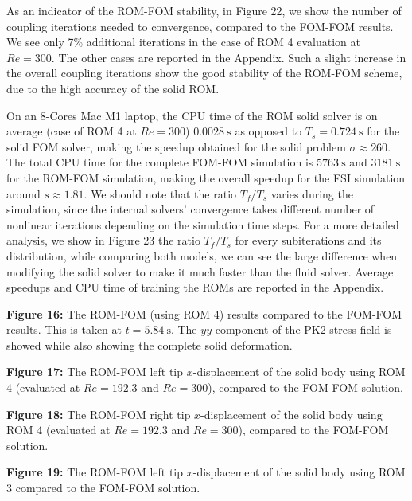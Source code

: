 \documentclass[11pt]{article}
\begin{document}
As an indicator of the ROM-FOM stability, in Figure 22, we show the number of coupling iterations needed to convergence, compared to the FOM-FOM results. We see only 7\% additional iterations in the case of ROM 4 evaluation at $Re = 300$. The other cases are reported in the Appendix. Such a slight increase in the overall coupling iterations show the good stability of the ROM-FOM scheme, due to the high accuracy of the solid ROM.

On an 8-Cores Mac M1 laptop, the CPU time of the ROM solid solver is on average (case of ROM 4 at $Re = 300$) $0.0028\ \mathrm{s}$ as opposed to $T_s = 0.724\ \mathrm{s}$ for the solid FOM solver, making the speedup obtained for the solid problem $\sigma \approx 260$. The total CPU time for the complete FOM-FOM simulation is $5763\ \mathrm{s}$ and $3181\ \mathrm{s}$ for the ROM-FOM simulation, making the overall speedup for the FSI simulation around $s \approx 1.81$. We should note that the ratio $T_f/T_s$ varies during the simulation, since the internal solvers' convergence takes different number of nonlinear iterations depending on the simulation time steps. For a more detailed analysis, we show in Figure 23 the ratio $T_f/T_s$ for every subiterations and its distribution, while comparing both models, we can see the large difference when modifying the solid solver to make it much faster than the fluid solver. Average speedups and CPU time of training the ROMs are reported in the Appendix.

\begin{center}
\textbf{Figure 16:} The ROM-FOM (using ROM 4) results compared to the FOM-FOM results. This is taken at $t = 5.84\ \mathrm{s}$. The $yy$ component of the PK2 stress field is showed while also showing the complete solid deformation.
\end{center}

\begin{center}
\textbf{Figure 17:} The ROM-FOM left tip $x$-displacement of the solid body using ROM 4 (evaluated at $Re = 192.3$ and $Re = 300$), compared to the FOM-FOM solution.
\end{center}

\begin{center}
\textbf{Figure 18:} The ROM-FOM right tip $x$-displacement of the solid body using ROM 4 (evaluated at $Re = 192.3$ and $Re = 300$), compared to the FOM-FOM solution.
\end{center}

\begin{center}
\textbf{Figure 19:} The ROM-FOM left tip $x$-displacement of the solid body using ROM 3 compared to the FOM-FOM solution.
\end{center}
\end{document}
